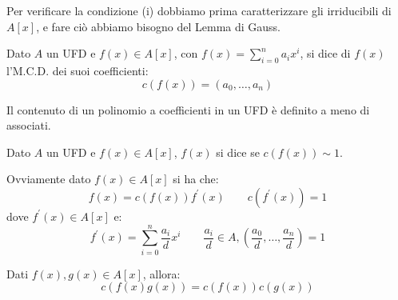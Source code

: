 \documentclass[11pt]{scrartcl}
\begin{document}
Per verificare la condizione (i) dobbiamo prima caratterizzare gli irriducibili di $A[x]$, e fare ciò abbiamo bisogno del Lemma di Gauss.

\begin{definition}
    Dato $A$ un UFD e $f(x) \in A[x]$, con $f(x) = \sum_{i=0}^n a_ix^i$, si dice  di $f(x)$ l'M.C.D. dei suoi coefficienti:
    \[ c(f(x)) = (a_0,\ldots,a_n)
        \]
\end{definition}

\begin{remark}
    Il contenuto di un polinomio a coefficienti in un UFD è definito a meno di associati.
\end{remark}

\begin{definition}
    Dato $A$ un UFD e $f(x) \in A[x]$, $f(x)$ si dice  se $c(f(x)) \sim 1$.
\end{definition}

\begin{remark}
    Ovviamente dato $f(x) \in A[x]$ si ha che:
    \[ f(x) = c(f(x))f^{\prime}(x) \qquad c(f^{\prime}(x)) = 1
        \]
    dove $f^{\prime}(x) \in A[x]$ e:
    \[ f^{\prime}(x) = \sum_{i=0}^n \frac{a_i}{d}x^i \qquad \frac{a_i}{d} \in A, \left(\frac{a_0}{d},\ldots,\frac{a_n}{d}\right) = 1
        \]
\end{remark}

\begin{lemma}
    \label{gauss}
    Dati $f(x),g(x) \in A[x]$, allora:
    \[ c(f(x)g(x)) = c(f(x))c(g(x))
        \]
\end{lemma}
\end{document}
